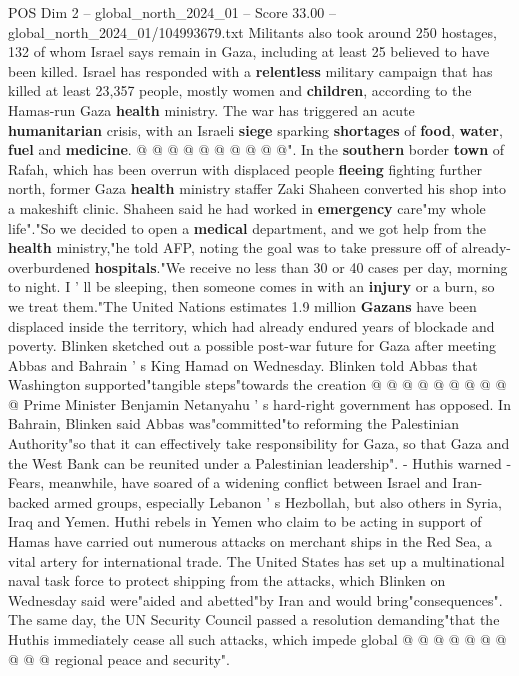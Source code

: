 \begin{textsample}{POS Dim 2 – global\_north\_2024\_01 – Score 33.00 – global\_north\_2024\_01/104993679.txt}
Militants also took around 250 hostages, 132 of whom Israel says remain in Gaza, including at least 25 believed to have been killed.
Israel has responded with a \textbf{relentless} military campaign that has killed at least 23,357 people, mostly women and \textbf{children}, according to the Hamas-run Gaza \textbf{health} ministry.
The war has triggered an acute \textbf{humanitarian} crisis, with an Israeli \textbf{siege} sparking \textbf{shortages} of \textbf{food}, \textbf{water}, \textbf{fuel} and \textbf{medicine}. @ @ @ @ @ @ @ @ @ @".
In the \textbf{southern} border \textbf{town} of Rafah, which has been overrun with displaced people \textbf{fleeing} fighting further north, former Gaza \textbf{health} ministry staffer Zaki Shaheen converted his shop into a makeshift clinic.
Shaheen said he had worked in \textbf{emergency} care"my whole life"."So we decided to open a \textbf{medical} department, and we got help from the \textbf{health} ministry,"he told AFP, noting the goal was to take pressure off of already-overburdened \textbf{hospitals}."We receive no less than 30 or 40 cases per day, morning to night.
I ' ll be sleeping, then someone comes in with an \textbf{injury} or a burn, so we treat them."The United Nations estimates 1.9 million \textbf{Gazans} have been displaced inside the territory, which had already endured years of blockade and poverty.
Blinken sketched out a possible post-war future for Gaza after meeting Abbas and Bahrain ' s King Hamad on Wednesday.
Blinken told Abbas that Washington supported"tangible steps"towards the creation @ @ @ @ @ @ @ @ @ @ Prime Minister Benjamin Netanyahu ' s hard-right government has opposed.
In Bahrain, Blinken said Abbas was"committed"to reforming the Palestinian Authority"so that it can effectively take responsibility for Gaza, so that Gaza and the West Bank can be reunited under a Palestinian leadership". - Huthis warned - Fears, meanwhile, have soared of a widening conflict between Israel and Iran-backed armed groups, especially Lebanon ' s Hezbollah, but also others in Syria, Iraq and Yemen.
Huthi rebels in Yemen who claim to be acting in support of Hamas have carried out numerous attacks on merchant ships in the Red Sea, a vital artery for international trade.
The United States has set up a multinational naval task force to protect shipping from the attacks, which Blinken on Wednesday said were"aided and abetted"by Iran and would bring"consequences".
The same day, the UN Security Council passed a resolution demanding"that the Huthis immediately cease all such attacks, which impede global @ @ @ @ @ @ @ @ @ @ regional peace and security".

\end{textsample}
